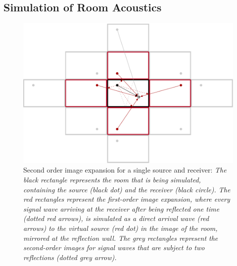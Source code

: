 \subsection{Simulation of Room Acoustics}
\label{sec:simulation}

\begin{figure}[!tb]
\centering
    \includegraphics[width=\textwidth]{data/figures/image-method3}
    \caption[Second order image expansion for a single source and receiver]{Second order image expansion for a single source and receiver: \itshape The black rectangle represents the room that is being simulated, containing the source (black dot) and the receiver (black circle). The red rectangles represent the first-order image expansion, where every signal wave arriving at the receiver after being reflected one time (dotted red arrows), is simulated as a direct arrival wave (red arrows) to the virtual source (red dot) in the image of the room, mirrored at the reflection wall. The grey rectangles represent the second-order images for signal waves that are subject to two reflections (dotted grey arrow).}
    \label{fig:imageMethod}
\end{figure}

